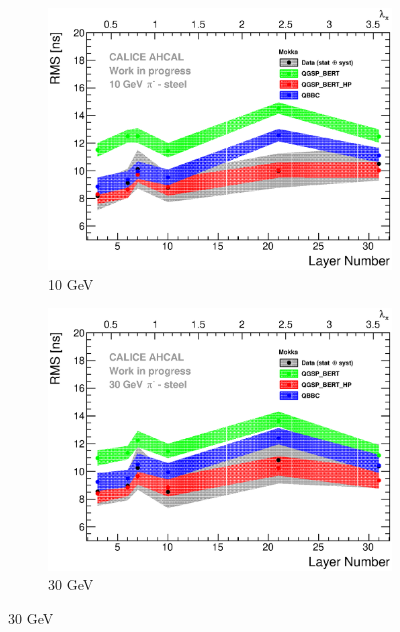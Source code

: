 \begin{figure}[htbp!]
  \begin{subfigure}[t]{0.49\textwidth}
    \centering
    \includegraphics[width=1\textwidth]{../Thesis_Plots/Timing/Pions/Plots/ComparisonToSim/RMS_Depth_10GeV_Mokka.eps}
    \caption{10 GeV}\label{fig:Depth_RMS_SimData_10GeV_Mokka}
  \end{subfigure}
  \hfill
  \begin{subfigure}[t]{0.49\textwidth}
    \centering
    \includegraphics[width=1\textwidth]{../Thesis_Plots/Timing/Pions/Plots/ComparisonToSim/RMS_Depth_30GeV_Mokka.eps}
    \caption{30 GeV}\label{fig:Depth_RMS_SimData_30GeV_Mokka}
  \end{subfigure}

\end{figure}

